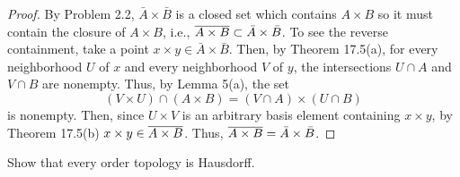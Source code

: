 \begin{proof}
By Problem 2.2, $\bar A\times\bar B$ is a closed set which
contains $A\times B$ so it must contain the closure of $A\times
B$, i.e., $\overline{A\times B}\subset\bar A\times\bar B$. To see the
reverse containment, take a point $x\times y\in\bar A\times\bar
B$. Then, by Theorem 17.5(a), for every neighborhood $U$ of $x$
and every neighborhood $V$ of $y$, the intersections $U\cap A$
and $V\cap B$ are nonempty. Thus, by Lemma 5(a), the set
\[
(V\times U)\cap(A\times B)=(V\cap A)\times (U\cap B)
\]
is nonempty. Then, since $U\times V$ is an arbitrary basis
element containing $x\times y$, by Theorem 17.5(b) $x\times
y\in\overline{A\times B}$. Thus, $\overline{A\times B}=\bar A\times\bar
B$.
\end{proof}
\newpage
\begin{problem}[Munkres \S17, p.\,101, 10]
Show that every order topology is Hausdorff.
\end{problem}
